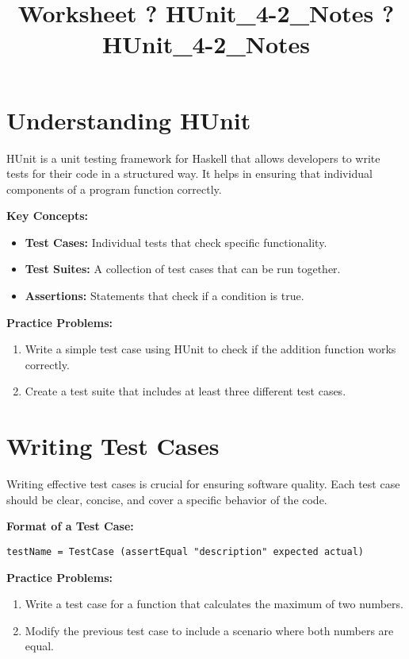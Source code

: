 \documentclass{article}
\title{Worksheet ? HUnit\_4-2\_Notes ? HUnit\_4-2\_Notes}
\author{}
\date{}
\begin{document}
\maketitle

\section*{Understanding HUnit}
HUnit is a unit testing framework for Haskell that allows developers to write tests for their code in a structured way. It helps in ensuring that individual components of a program function correctly.

\textbf{Key Concepts:}
\begin{itemize}
    \item \textbf{Test Cases:} Individual tests that check specific functionality.
    \item \textbf{Test Suites:} A collection of test cases that can be run together.
    \item \textbf{Assertions:} Statements that check if a condition is true.
\end{itemize}

\textbf{Practice Problems:}
\begin{enumerate}
    \item Write a simple test case using HUnit to check if the addition function works correctly. 
    \item Create a test suite that includes at least three different test cases.
\end{enumerate}

\section*{Writing Test Cases}
Writing effective test cases is crucial for ensuring software quality. Each test case should be clear, concise, and cover a specific behavior of the code.

\textbf{Format of a Test Case:}
\begin{verbatim}
testName = TestCase (assertEqual "description" expected actual)
\end{verbatim}

\textbf{Practice Problems:}
\begin{enumerate}
    \item Write a test case for a function that calculates the maximum of two numbers.
    \item Modify the previous test case to include a scenario where both numbers are equal.
\end{enumerate}
\end{document}
